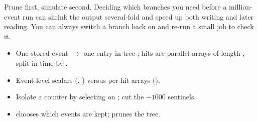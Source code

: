 \begin{tip}
Prune first, simulate second. Deciding which branches you need before a million-event run can shrink the output several-fold and speed up both writing and later reading. You can always switch a branch back on and re-run a small job to check it.
\end{tip}

\begin{recap}
\begin{itemize}
  \item One stored event \(\rightarrow\) one entry in tree ; hits are parallel arrays of length , split in time by .
  \item Event-level scalars (, ) versus per-hit arrays ().
  \item Isolate a counter by selecting on ; cut the \(-1000\) sentinels.
  \item {} chooses which events are kept;  prunes the tree.
\end{itemize}
\end{recap}
